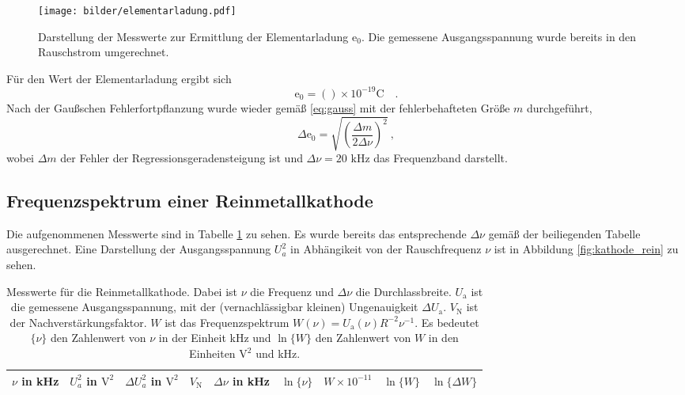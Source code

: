 	\begin{figure}
		\centering
		\texttt{[image: bilder/elementarladung.pdf]}
		\caption{Darstellung der Messwerte zur Ermittlung der
		Elementarladung $\text{e}_0$. Die gemessene Ausgangsspannung
		wurde bereits in den Rauschstrom umgerechnet.}
		\label{fig:elementarladung}
	\end{figure}

	Für den Wert der Elementarladung ergibt sich
	\begin{equation}
	\text{e}_0 = () \times
				10^{-19}\text{C} \quad .
	\end{equation}
	Nach der Gaußschen Fehlerfortpflanzung wurde wieder gemäß \eqref{eq:gauss} mit der
    fehlerbehafteten Größe $m$ durchgeführt,
	\begin{equation}
      \Delta \text{e}_0 = \sqrt{\left( \frac{\Delta m}{2 \Delta \nu}
        \right)^2}~,
	\end{equation}
	wobei $\Delta m$ der Fehler der Regressionsgeradensteigung ist und
	$\Delta \nu=20\text{ kHz}$ das Frequenzband darstellt.

\clearpage
\subsection{Frequenzspektrum einer Reinmetallkathode}

	Die aufgenommenen Messwerte sind in Tabelle
	\ref{tab:kathode_rein} zu sehen. Es wurde bereits das
	entsprechende $\Delta \nu$ gemäß der beiliegenden Tabelle
	ausgerechnet. Eine Darstellung der Ausgangsspannung $U_a^2$ in
	Abhängikeit von der Rauschfrequenz $\nu$ ist in Abbildung
	\ref{fig:kathode_rein} zu sehen.
	\begin{table}[h]
		\centering
		\begin{tabular}{ccccccccc}
		\toprule \midrule
		$\nu$ in kHz	 & $U_a^2$ in $\text{V}^2$	& $\Delta U_a^2$ in $\text{V}^2$ &
		$V_\text{N}$	 & $\Delta \nu$ in kHz 		& $\ln \{\nu\}$				     &
        $W\times 10^{-11}$&$\ln \{W\}$	 & $\ln \{\Delta W\} $ \\
		\midrule
		
		\midrule
		\bottomrule
		\end{tabular}
		\caption{Messwerte für
		die Reinmetallkathode. Dabei ist $\nu$ die Frequenz und $\Delta \nu$ die
		Durchlassbreite. $U_\text{a}$ ist die gemessene Ausgangsspannung, mit der
		(vernachlässigbar kleinen) Ungenauigkeit $\Delta U_\text{a}$. $V_\text{N}$
		ist der Nachverstärkungsfaktor. $W$ ist das Frequenzspektrum
		$W(\nu)=U_\text{a}(\nu) R^{-2} \nu^{-1}$. Es bedeutet $\{\nu \}$ den
		Zahlenwert von $\nu$ in der Einheit kHz und $\ln\{W\}$ den Zahlenwert
		von $W$ in den Einheiten $\text{V}^2$ und kHz.}
		\label{tab:kathode_rein}
	\end{table}


